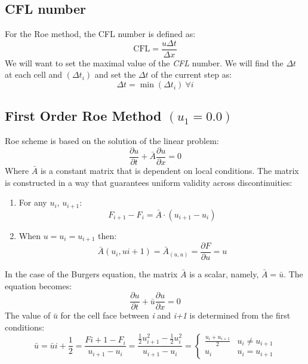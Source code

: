 \documentclass[11pt, a4paper]{article}
\begin{document}
\subsection{CFL number}
For the Roe method, the CFL number is defined as:
\begin{equation}
    \mathrm{CFL}=\frac{u\Delta t}{\Delta x}
\end{equation}
We will want to set the maximal value of the \emph{CFL} number. We will find the $\Delta t$ at each cell and $\left(\Delta t_i\right)$ and set the $\Delta t$ of the current step as:
\begin{equation}
    \Delta t=\min\left(\Delta t_i\right)\ \forall i
\end{equation}

\subsection{First Order Roe Method $(u_1 = 0.0)$}
\label{Roe_first}
Roe scheme is based on the solution of the linear problem:
\begin{equation}
        \displaystyle\frac{\partial u}{\partial t} + \bar{A}\frac{\partial u}{\partial x} = 0 
\end{equation}
Where $\bar{A}$ is a constant matrix that is dependent on local conditions. The matrix is constructed in a way that guarantees uniform validity across discontinuities: 
\begin{enumerate}
    \item For any $u_i$, $u_{i+1}$:\begin{equation*}
        F_{i+1}-F_{i} = \bar{A}\cdot\left(u_{i+1}-u_i\right)
    \end{equation*}
    \item When $u=u_i=u_{i+1}$ then:\begin{equation*}
        \bar{A}{\left(u_i,u{i+1}\right)}=\bar{A}_{\left(u,u\right)}=\frac{\partial F}{\partial u}=u
    \end{equation*}
\end{enumerate}
In the case of the Burgers equation, the matrix $\bar{A}$ is a scalar, namely, $\bar{A}=\bar{u}$. The equation becomes:
\begin{equation}
        \displaystyle\frac{\partial u}{\partial t} + \bar{u}\frac{\partial u}{\partial x} = 0 
\end{equation}
The value of $\bar{u}$ for the cell face between \emph{i} and \emph{i+1} is determined from the first conditions:
\begin{equation}
    \bar{u}=\bar{u}{i+\frac{1}{2}}=\frac{F{i+1}-F_i}{u_{i+1}-u_i}=\frac{\displaystyle\frac{1}{2}u_{i+1}^2-\frac{1}{2}u_i^2}{u_{i+1}-u_i}=\left\{\begin{array}{cc}
        \displaystyle\frac{u_i+u_{i+1}}{2} & u_i\neq u_{i+1} \\
        u_i & u_i=u_{i+1} 
    \end{array}\right.
\end{equation}
\end{document}
